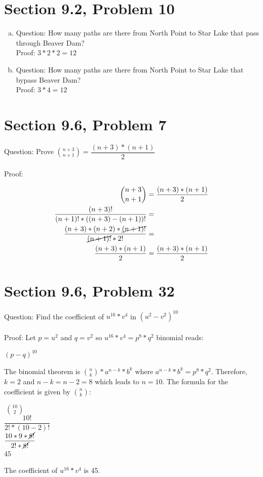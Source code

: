 \documentclass{article}
\begin{document}
\section*{Section 9.2, Problem 10}
\begin{enumerate}[(a)]
	\item Question: How many paths are there from North Point to Star Lake that pass through Beaver Dam?\\
	Proof: $3*2*2=12$
	\item Question: How many paths are there from North Point to Star Lake that bypass Beaver Dam?\\
	Proof: $3*4=12$
\end{enumerate}

\clearpage
\header

\section*{Section 9.6, Problem 7}
Question: Prove $\displaystyle \binom{n+3}{n+1}=\dfrac{(n+3)*(n+1)}{2}$
\\\\
Proof:
\begin{center}
	\begin{align*}
		\displaystyle \binom{n+3}{n+1}&=\dfrac{(n+3)*(n+1)}{2}\\
		\dfrac{(n+3)!}{(n+1)!*((n+3)-(n+1))!}&=\\
		\dfrac{(n+3)*(n+2)*\cancel{(n+1)!}}{\cancel{(n+1)!}*2!}&=\\
		\dfrac{(n+3)*(n+1)}{2}&=\dfrac{(n+3)*(n+1)}{2}
	\end{align*}
\end{center}

\clearpage
\header

\section*{Section 9.6, Problem 32}
Question: Find the coefficient of $u^{16}*v^4$ in $(u^2-v^2)^{10}$
\\\\
Proof: Let $p=u^2$ and $q=v^2$ so $u^{16}*v^4=p^8*q^2$ binomial reads:
\begin{center}
	$(p-q)^{10}$
\end{center}
The binomial theorem is $\displaystyle \binom{n}{k}*a^{n-k}*b^k$ where $a^{n-k}*b^k=p^8*q^2$. Therefore, $k=2$ and $n-k=n-2=8$ which leads to $n=10$. The formula for the coefficient is given by $\displaystyle \binom{n}{k}$:
\begin{center}
	$\displaystyle\ \binom{10}{2}$\\
	$\dfrac{10!}{2!*(10-2)!}$\\
	$\dfrac{10*9*\cancel{8!}}{2!*\cancel{8!}}$\\
	$45$
\end{center}
The coefficient of $u^{16}*v^4$ is 45.
\end{document}
